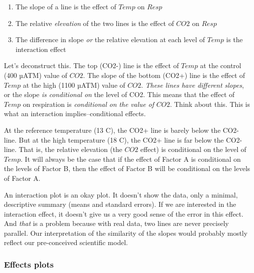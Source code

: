 \documentclass[]{book}
\providecommand{\tightlist}{%
  \setlength{\itemsep}{0pt}\setlength{\parskip}{0pt}}
\begin{document}
\begin{enumerate}
\def\labelenumi{\arabic{enumi}.}
\tightlist
\item
  The slope of a line is the effect of \(Temp\) on \(Resp\)
\item
  The relative \emph{elevation} of the two lines is the effect of \(CO2\) on \(Resp\)
\item
  The difference in slope \emph{or} the relative elevation at each level of \(Temp\) is the interaction effect
\end{enumerate}

Let's deconstruct this. The top (CO2-) line is the effect of \(Temp\) at the control (400 µATM) value of \(CO2\). The slope of the bottom (CO2+) line is the effect of \(Temp\) at the high (1100 µATM) value of \(CO2\). \emph{These lines have different slopes}, or the slope \emph{is conditional on} the level of CO2. This means that the effect of \(Temp\) on respiration is \emph{conditional on the value of \(CO2\)}. Think about this. This is what an interaction implies--conditional effects.

At the reference temperature (13 C), the CO2+ line is barely below the CO2- line. But at the high temperature (18 C), the CO2+ line is far below the CO2- line. That is, the relative elevation (the \(CO2\) effect) is conditional on the level of \(Temp\). It will always be the case that if the effect of Factor A is conditional on the levels of Factor B, then the effect of Factor B will be conditional on the levels of Factor A.

An interaction plot is an okay plot. It doesn't show the data, only a minimal, descriptive summary (means and standard errors). If we are interested in the interaction effect, it doesn't give us a very good sense of the error in this effect. And \emph{that} is a problem because with real data, two lines are never precisely parallel. Our interpretation of the similarity of the slopes would probably mostly reflect our pre-conceived scientific model.

\hypertarget{effects-plots}{%
\subsubsection{Effects plots}\label{effects-plots}}
\end{document}
